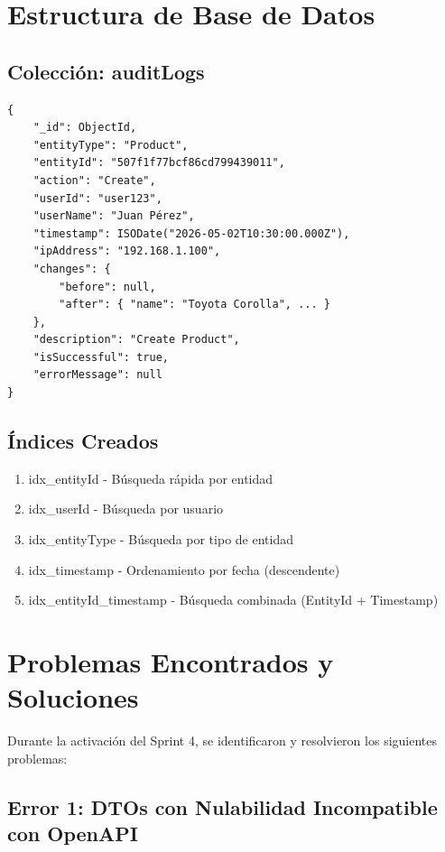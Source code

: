 \documentclass[12pt,a4paper]{article}
\begin{document}
\section{Estructura de Base de Datos}

\subsection{Colección: auditLogs}

\begin{lstlisting}
{
    "_id": ObjectId,
    "entityType": "Product",
    "entityId": "507f1f77bcf86cd799439011",
    "action": "Create",
    "userId": "user123",
    "userName": "Juan Pérez",
    "timestamp": ISODate("2026-05-02T10:30:00.000Z"),
    "ipAddress": "192.168.1.100",
    "changes": {
        "before": null,
        "after": { "name": "Toyota Corolla", ... }
    },
    "description": "Create Product",
    "isSuccessful": true,
    "errorMessage": null
}
\end{lstlisting}

\subsection{Índices Creados}

\begin{enumerate}
    \item idx\_entityId - Búsqueda rápida por entidad
    \item idx\_userId - Búsqueda por usuario
    \item idx\_entityType - Búsqueda por tipo de entidad
    \item idx\_timestamp - Ordenamiento por fecha (descendente)
    \item idx\_entityId\_timestamp - Búsqueda combinada (EntityId + Timestamp)
\end{enumerate}

\section{Problemas Encontrados y Soluciones}

Durante la activación del Sprint 4, se identificaron y resolvieron los siguientes problemas:

\subsection{Error 1: DTOs con Nulabilidad Incompatible con OpenAPI}
\end{document}
